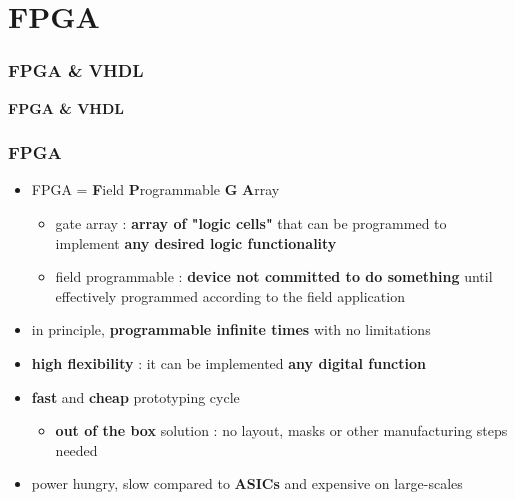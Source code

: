 \documentclass[aspectratio=169]{beamer}
\begin{document}
	\section{FPGA}
	
		
	\begin{frame}
	\frametitle{FPGA \& VHDL}
	\begin{center}
		{\Huge {}\selectfont \color{blue} \textbf{FPGA \& VHDL}}
	\end{center}
	\end{frame}
	
	\begin{frame}
	\frametitle{FPGA}
	{\Large 
		\begin{itemize}
			\item FPGA = \textbf{F}ield \textbf{P}rogrammable \textbf{G} \textbf{A}rray
			\begin{itemize}
				\item gate array : \textbf{array of "logic cells"} that can be programmed to implement \textbf{any desired logic functionality}
				\item field programmable : \textbf{device not committed to do something} until effectively programmed according to the field application
			\end{itemize}
		\item in principle, \textbf{programmable infinite times} with no limitations
		\item \textbf{high flexibility} : it can be implemented \textbf{any digital function}
		\item \textbf{fast} and \textbf{cheap} prototyping cycle
		\begin{itemize}
			\item \textbf{out of the box} solution : no layout, masks or other manufacturing steps needed
		\end{itemize}
		\item {\color{orange} power hungry, slow compared to \textbf{ASICs} and expensive on large-scales}
		\end{itemize}
	}
	\end{frame}
\end{document}
